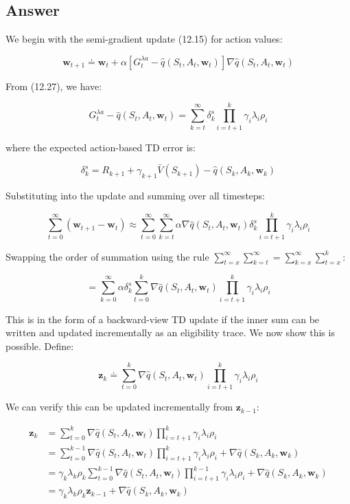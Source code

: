 \documentclass{article}
\begin{document}
\subsection*{Answer}

We begin with the semi-gradient update (12.15) for action values:

$$\mathbf{w}_{t+1} \doteq \mathbf{w}_t + \alpha\left[G_t^{\lambda a} - 
\hat{q}(S_t, A_t, \mathbf{w}_t)\right]\nabla\hat{q}(S_t, A_t, \mathbf{w}_t)$$

From (12.27), we have:

$$G_t^{\lambda a} - \hat{q}(S_t, A_t, \mathbf{w}_t) = \sum_{k=t}^{\infty} \delta_k^s 
\prod_{i=t+1}^{k} \gamma_i \lambda_i \rho_i$$

where the expected action-based TD error is:

$$\delta_k^s = R_{k+1} + \gamma_{k+1}\bar{V}(S_{k+1}) - \hat{q}(S_k, A_k, \mathbf{w}_k)$$

Substituting into the update and summing over all timesteps:

$$\sum_{t=0}^{\infty}(\mathbf{w}_{t+1} - \mathbf{w}_t) \approx \sum_{t=0}^{\infty} 
\sum_{k=t}^{\infty} \alpha \nabla\hat{q}(S_t, A_t, \mathbf{w}_t) \delta_k^s 
\prod_{i=t+1}^{k} \gamma_i \lambda_i \rho_i$$

Swapping the order of summation using the rule 
$\sum_{t=x}^{\infty}\sum_{k=t}^{\infty} = \sum_{k=x}^{\infty}\sum_{t=x}^{k}$:

$$= \sum_{k=0}^{\infty} \alpha \delta_k^s \sum_{t=0}^{k} \nabla\hat{q}(S_t, A_t, 
\mathbf{w}_t) \prod_{i=t+1}^{k} \gamma_i \lambda_i \rho_i$$

This is in the form of a backward-view TD update if the inner sum can be written and 
updated incrementally as an eligibility trace. We now show this is possible. Define:

$$\mathbf{z}_k \doteq \sum_{t=0}^{k} \nabla\hat{q}(S_t, A_t, \mathbf{w}_t) 
\prod_{i=t+1}^{k} \gamma_i \lambda_i \rho_i$$

We can verify this can be updated incrementally from $\mathbf{z}_{k-1}$:

\begin{align*}
\mathbf{z}_k &= \sum_{t=0}^{k} \nabla\hat{q}(S_t, A_t, \mathbf{w}_t) 
\prod_{i=t+1}^{k} \gamma_i \lambda_i \rho_i \\
&= \sum_{t=0}^{k-1} \nabla\hat{q}(S_t, A_t, \mathbf{w}_t) 
\prod_{i=t+1}^{k} \gamma_i \lambda_i \rho_i + \nabla\hat{q}(S_k, A_k, \mathbf{w}_k) \\
&= \gamma_k \lambda_k \rho_k \sum_{t=0}^{k-1} \nabla\hat{q}(S_t, A_t, \mathbf{w}_t) 
\prod_{i=t+1}^{k-1} \gamma_i \lambda_i \rho_i + \nabla\hat{q}(S_k, A_k, \mathbf{w}_k) \\
&= \gamma_k \lambda_k \rho_k \mathbf{z}_{k-1} + \nabla\hat{q}(S_k, A_k, \mathbf{w}_k)
\end{align*}
\end{document}
